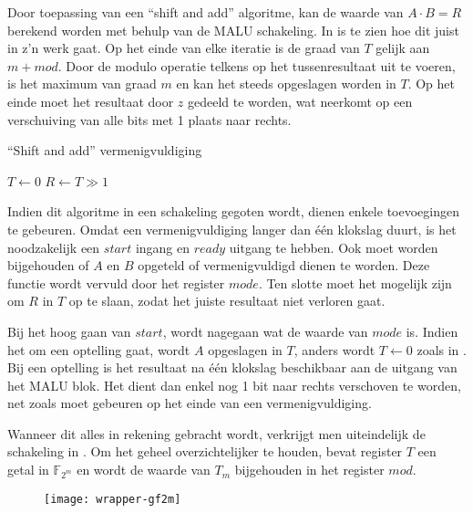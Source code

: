 Door toepassing van een ``shift and add'' algoritme, kan de waarde van $A \cdot B = R$ berekend worden met behulp van de MALU schakeling. In  is te zien hoe dit juist in z'n werk gaat. Op het einde van elke iteratie is de graad van $T$ gelijk aan $m + mod$. Door de modulo operatie telkens op het tussenresultaat uit te voeren, is het maximum van graad $m$ en kan het steeds opgeslagen worden in $T$. Op het einde moet het resultaat door $z$ gedeeld te worden, wat neerkomt op een verschuiving van alle bits met 1 plaats naar rechts.

\begin{algorithm}[h]
\dontprintsemicolon
\caption{``Shift and add'' vermenigvuldiging}\label{algoritme-implementatie-gf2m-multiply}
$T \leftarrow 0$\;
$R \leftarrow T \gg 1$\;
\end{algorithm}

Indien dit algoritme in een schakeling gegoten wordt, dienen enkele toevoegingen te gebeuren. Omdat een vermenigvuldiging langer dan \'e\'en klokslag duurt, is het noodzakelijk een $start$ ingang en $ready$ uitgang te hebben. Ook moet worden bijgehouden of $A$ en $B$ opgeteld of vermenigvuldigd dienen te worden. Deze functie wordt vervuld door het register $mode$. Ten slotte moet het mogelijk zijn om $R$ in $T$ op te slaan, zodat het juiste resultaat niet verloren gaat.

Bij het hoog gaan van $start$, wordt nagegaan wat de waarde van $mode$ is. Indien het om een optelling gaat, wordt $A$ opgeslagen in $T$, anders wordt $T \leftarrow 0$ zoals in . Bij een optelling is het resultaat na \'e\'en klokslag beschikbaar aan de uitgang van het MALU blok. Het dient dan enkel nog 1 bit naar rechts verschoven te worden, net zoals moet gebeuren op het einde van een vermenigvuldiging.

Wanneer dit alles in rekening gebracht wordt, verkrijgt men uiteindelijk de schakeling in . Om het geheel overzichtelijker te houden, bevat register $T$ een getal in $\mathbb{F}_{2^m}$ en wordt de waarde van $T_m$ bijgehouden in het register $mod$.

\begin{figure}[h]
	\begin{center}
		\texttt{[image: wrapper-gf2m]}
		\label{figuur-implementatie-wrapper-gf2m}
	\end{center}
\end{figure}

